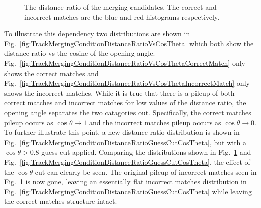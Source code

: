 \begin{figure}
  \centering
  \caption{The distance ratio of the merging candidates.  The correct and incorrect matches are the blue and red histograms respectively.}
  \label{fig:TrackMergingConditionDistanceRatio}
\end{figure}
To illustrate this dependency two distributions are shown in Fig.~\ref{fig:TrackMergingConditionDistanceRatioVsCosTheta} which both show the distance ratio vs the cosine of the opening angle.  Fig.~\ref{fig:TrackMergingConditionDistanceRatioVsCosThetaCorrectMatch} only shows the correct matches and Fig.~\ref{fig:TrackMergingConditionDistanceRatioVsCosThetaIncorrectMatch} only shows the incorrect matches.  While it is true that there is a pileup of both correct matches and incorrect matches for low values of the distance ratio, the opening angle separates the two catagories out.  Specifically, the correct matches pileup occurs as $\cos\theta \rightarrow 1$ and the incorrect matches pileup occurs as $\cos\theta \rightarrow 0$.  To further illustrate this point, a new distance ratio distribution is shown in Fig.~\ref{fig:TrackMergingConditionDistanceRatioGuessCutCosTheta}, but with a $\cos\theta > 0.8$ guess cut applied.  Comparing the distributions shown in Fig.~\ref{fig:TrackMergingConditionDistanceRatio} and Fig.~\ref{fig:TrackMergingConditionDistanceRatioGuessCutCosTheta}, the effect of the $\cos\theta$ cut can clearly be seen.  The original pileup of incorrect matches seen in Fig.~\ref{fig:TrackMergingConditionDistanceRatio} is now gone, leaving an essentially flat incorrect matches distribution in Fig.~\ref{fig:TrackMergingConditionDistanceRatioGuessCutCosTheta} while leaving the correct matches structure intact.  
